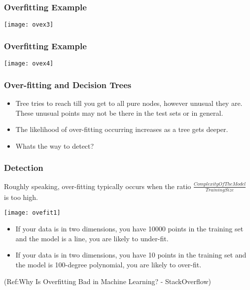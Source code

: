 \begin{frame}[fragile]\frametitle{Overfitting Example}
\begin{center}
\texttt{[image: ovex3]}
\end{center}
\end{frame}

\begin{frame}[fragile]\frametitle{Overfitting Example}
\begin{center}
\texttt{[image: ovex4]}
\end{center}
\end{frame}


\begin{frame}[fragile]\frametitle{Over-fitting and Decision Trees}
\begin{itemize}
\item Tree tries to reach till you get to all pure nodes, however unusual they are. These unusual points may not be there in the test sets or in general.
\item The likelihood of over-fitting occurring increases as a tree gets deeper. 
\item Whats the way to detect?
\end{itemize}
\end{frame}


\begin{frame}[fragile]\frametitle{Detection}
Roughly speaking, over-fitting typically occurs when the ratio $\frac{ComplexityOfTheModel}{TrainingSize}$ is too high.

\begin{center}
\texttt{[image: ovefit1]}
\end{center}
	\begin{itemize}
	\item If your data is in two dimensions, you have 10000 points in the training set and the model is a line, you are likely to under-fit.
	\item If your data is in two dimensions, you have 10 points in the training set and the model is 100-degree polynomial, you are likely to over-fit. 
	\end{itemize}
	
(Ref:Why Is Overfitting Bad in Machine Learning? - StackOverflow)
\end{frame}

